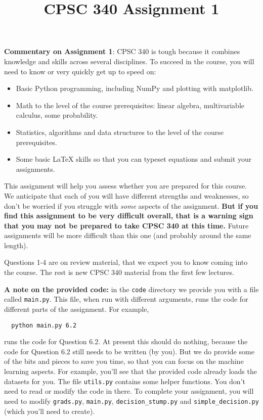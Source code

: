 \documentclass{article}
\begin{document}
  \title{CPSC 340 Assignment 1}

  \date{}
  \maketitle


  \textbf{Commentary on Assignment 1}: CPSC 340 is tough because it combines knowledge and skills across several disciplines. To succeed
  in the course, you will need to know or very quickly get up to speed on:
  \begin{itemize}
  \item Basic Python programming, including NumPy and plotting with matplotlib.
  \item Math to the level of the course prerequisites: linear algebra, multivariable calculus, some probability.
  \item Statistics, algorithms and data structures to the level of the course prerequisites.
  \item Some basic LaTeX skills so that you can typeset equations and submit your assignments.
  \end{itemize}

  This assignment will help you assess whether you are prepared for this course. We anticipate that each
  of you will have different strengths and weaknesses, so don't be worried if you struggle with \emph{some} aspects
  of the assignment. \textbf{But if you find this assignment
  to be very difficult overall, that is a warning sign that you may not be prepared to take CPSC 340
  at this time.} Future assignments will be more difficult than this one (and probably around the same length).

  Questions 1-4 are on review material, that we expect you to know coming into the course. The rest is new CPSC 340 material from the first few lectures.

  \textbf{A note on the provided code:} in the \texttt{code} directory we provide you with a file called
  \texttt{main.py}. This file, when run with different arguments, runs the code for different
  parts of the assignment. For example,
  \begin{verbatim}
  python main.py 6.2
  \end{verbatim}
  runs the code for Question 6.2. At present this should do nothing, because the code
  for Question 6.2 still needs to be written (by you). But we do provide some of the bits
  and pieces to save you time, so that you can focus on the machine learning aspects.
  For example, you'll see that the provided code already loads the datasets for you.
  The file \texttt{utils.py} contains some helper functions.
  You don't need to read or modify the code in there.
  To complete your assignment, you will need to modify \texttt{grads.py}, \texttt{main.py}, \texttt{decision\string_stump.py} and \texttt{simple\string_decision.py} (which you'll need to create).
\end{document}
